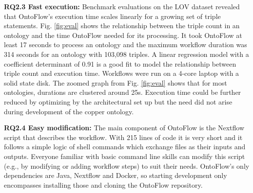 \documentclass[runningheads]{llncs}
\begin{document}
\noindent\textbf{RQ2.3 Fast execution:} Benchmark evaluations on the LOV dataset revealed that OntoFlow's execution time scales linearly for a growing set of triple statements. Fig. \ref{fig:eval} shows the relationship between the triple count in an ontology and the time OntoFlow needed for its processing. It took OntoFlow at least 17 seconds to process an ontology and the maximum workflow duration was 314 seconds for an ontology with 103,098 triples. A linear regression model with a coefficient determinant of 0.91 is a good fit to model the relationship between triple count and execution time. Workflows were run on a 4-core laptop with a solid state disk. The zoomed graph from Fig. \ref{fig:eval} shows that for most ontologies, durations are clustered around 25s. Execution time could be further reduced by optimizing by the architectural set up but the need did not arise during development of the copper ontology.

\noindent\textbf{RQ2.4 Easy modification:} The main component of OntoFlow is the Nextflow script that describes the workflow. With 215 lines of code it is very short and it follows a simple logic of shell commands which exchange files as their inputs and outputs. Everyone familiar with basic command line skills can modify this script (e.g., by modifying or adding workflow steps) to suit their needs. OntoFlow's only dependencies are Java, Nextflow and Docker, so starting development only encompasses installing those and cloning the OntoFlow repository. 
\end{document}
